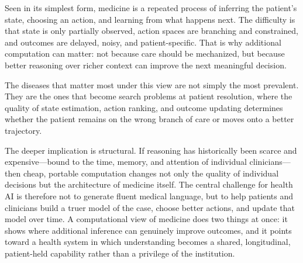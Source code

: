 \documentclass[11pt]{article}
\begin{document}
Seen in its simplest form, medicine is a repeated process of inferring the patient's state, choosing an action, and learning from what happens next. The difficulty is that state is only partially observed, action spaces are branching and constrained, and outcomes are delayed, noisy, and patient-specific. That is why additional computation can matter: not because care should be mechanized, but because better reasoning over richer context can improve the next meaningful decision.

The diseases that matter most under this view are not simply the most prevalent. They are the ones that become search problems at patient resolution, where the quality of state estimation, action ranking, and outcome updating determines whether the patient remains on the wrong branch of care or moves onto a better trajectory.

The deeper implication is structural. If reasoning has historically been scarce and expensive---bound to the time, memory, and attention of individual clinicians---then cheap, portable computation changes not only the quality of individual decisions but the architecture of medicine itself. The central challenge for health AI is therefore not to generate fluent medical language, but to help patients and clinicians build a truer model of the case, choose better actions, and update that model over time. A computational view of medicine does two things at once: it shows where additional inference can genuinely improve outcomes, and it points toward a health system in which understanding becomes a shared, longitudinal, patient-held capability rather than a privilege of the institution.

\clearpage


\end{document}
